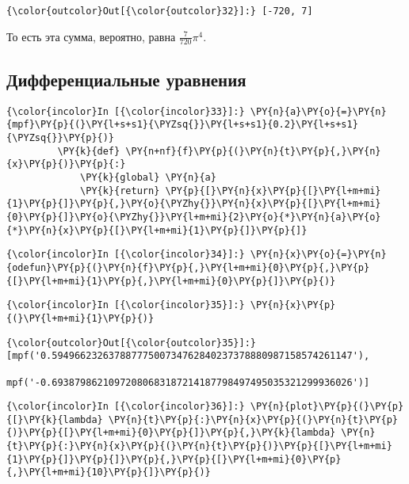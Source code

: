             \begin{Verbatim}[commandchars=\\\{\}]
{\color{outcolor}Out[{\color{outcolor}32}]:} [-720, 7]
\end{Verbatim}
        
    То есть эта сумма, вероятно, равна \(\frac{7}{720} \pi^4\).

\subsection{Дифференциальные уравнения}
\label{mpmath7}

    \begin{Verbatim}[commandchars=\\\{\}]
{\color{incolor}In [{\color{incolor}33}]:} \PY{n}{a}\PY{o}{=}\PY{n}{mpf}\PY{p}{(}\PY{l+s+s1}{\PYZsq{}}\PY{l+s+s1}{0.2}\PY{l+s+s1}{\PYZsq{}}\PY{p}{)}
         \PY{k}{def} \PY{n+nf}{f}\PY{p}{(}\PY{n}{t}\PY{p}{,}\PY{n}{x}\PY{p}{)}\PY{p}{:}
             \PY{k}{global} \PY{n}{a}
             \PY{k}{return} \PY{p}{[}\PY{n}{x}\PY{p}{[}\PY{l+m+mi}{1}\PY{p}{]}\PY{p}{,}\PY{o}{\PYZhy{}}\PY{n}{x}\PY{p}{[}\PY{l+m+mi}{0}\PY{p}{]}\PY{o}{\PYZhy{}}\PY{l+m+mi}{2}\PY{o}{*}\PY{n}{a}\PY{o}{*}\PY{n}{x}\PY{p}{[}\PY{l+m+mi}{1}\PY{p}{]}\PY{p}{]}
\end{Verbatim}

    \begin{Verbatim}[commandchars=\\\{\}]
{\color{incolor}In [{\color{incolor}34}]:} \PY{n}{x}\PY{o}{=}\PY{n}{odefun}\PY{p}{(}\PY{n}{f}\PY{p}{,}\PY{l+m+mi}{0}\PY{p}{,}\PY{p}{[}\PY{l+m+mi}{1}\PY{p}{,}\PY{l+m+mi}{0}\PY{p}{]}\PY{p}{)}
\end{Verbatim}

    \begin{Verbatim}[commandchars=\\\{\}]
{\color{incolor}In [{\color{incolor}35}]:} \PY{n}{x}\PY{p}{(}\PY{l+m+mi}{1}\PY{p}{)}
\end{Verbatim}

            \begin{Verbatim}[commandchars=\\\{\}]
{\color{outcolor}Out[{\color{outcolor}35}]:} [mpf('0.59496623263788777500734762840237378880987158574261147'),
          mpf('-0.69387986210972080683187214187798497495035321299936026')]
\end{Verbatim}
        
    \begin{Verbatim}[commandchars=\\\{\}]
{\color{incolor}In [{\color{incolor}36}]:} \PY{n}{plot}\PY{p}{(}\PY{p}{[}\PY{k}{lambda} \PY{n}{t}\PY{p}{:}\PY{n}{x}\PY{p}{(}\PY{n}{t}\PY{p}{)}\PY{p}{[}\PY{l+m+mi}{0}\PY{p}{]}\PY{p}{,}\PY{k}{lambda} \PY{n}{t}\PY{p}{:}\PY{n}{x}\PY{p}{(}\PY{n}{t}\PY{p}{)}\PY{p}{[}\PY{l+m+mi}{1}\PY{p}{]}\PY{p}{]}\PY{p}{,}\PY{p}{[}\PY{l+m+mi}{0}\PY{p}{,}\PY{l+m+mi}{10}\PY{p}{]}\PY{p}{)}
\end{Verbatim}

